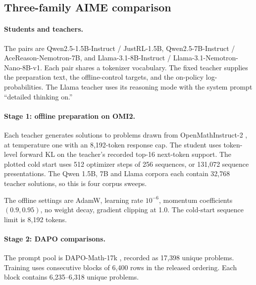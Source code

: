 \subsection{Three-family AIME comparison}
\label{app:preparation-multisetup}

\paragraph{Students and teachers.}
The pairs are Qwen2.5-1.5B-Instruct / JustRL-1.5B, Qwen2.5-7B-Instruct / AceReason-Nemotron-7B, and Llama-3.1-8B-Instruct / Llama-3.1-Nemotron-Nano-8B-v1. Each pair shares a tokenizer vocabulary. The fixed teacher supplies the preparation text, the offline-control targets, and the on-policy log-probabilities. The Llama teacher uses its reasoning mode with the system prompt ``detailed thinking on.'' 

\paragraph{Stage 1: offline preparation on OMI2.}
Each teacher generates solutions to problems drawn from OpenMathInstruct-2 \citep{toshniwal2024openmathinstruct2}, at temperature one with an 8,192-token response cap. The student uses token-level forward KL on the teacher's recorded top-16 next-token support. The plotted cold start uses 512 optimizer steps of 256 sequences, or 131,072 sequence presentations. The Qwen 1.5B, 7B and Llama corpora each contain 32,768 teacher solutions, so this is four corpus sweeps.

The offline settings are AdamW, learning rate $10^{-6}$, momentum coefficients $(0.9,0.95)$, no weight decay, gradient clipping at 1.0. The cold-start sequence limit is 8,192 tokens.

\paragraph{Stage 2: DAPO comparisons.}
The prompt pool is DAPO-Math-17k \citep{yu2025dapo}, recorded as 17,398 unique problems. Training uses consecutive blocks of 6,400 rows in the released ordering. Each block contains 6,235--6,318 unique problems.

